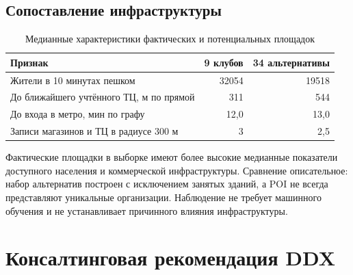 \documentclass[12pt,a4paper]{article}
\begin{document}
\subsection{Сопоставление инфраструктуры}
\begin{table}[H]\centering\caption{Медианные характеристики фактических и потенциальных площадок}\small\begin{tabularx}{\linewidth}{Yrr}\toprule Признак & 9 клубов & 34 альтернативы\\\midrule Жители в 10 минутах пешком & 32054 & 19518\\ До ближайшего учтённого ТЦ, м по прямой & 311 & 544\\ До входа в метро, мин по графу & 12,0 & 13,0\\ Записи магазинов и ТЦ в радиусе 300 м & 3 & 2,5\\\bottomrule\end{tabularx}\end{table}
Фактические площадки в выборке имеют более высокие медианные показатели доступного населения и коммерческой инфраструктуры. Сравнение описательное: набор альтернатив построен с исключением занятых зданий, а POI не всегда представляют уникальные организации. Наблюдение не требует машинного обучения и не устанавливает причинного влияния инфраструктуры.

\section{Консалтинговая рекомендация DDX}
\end{document}
